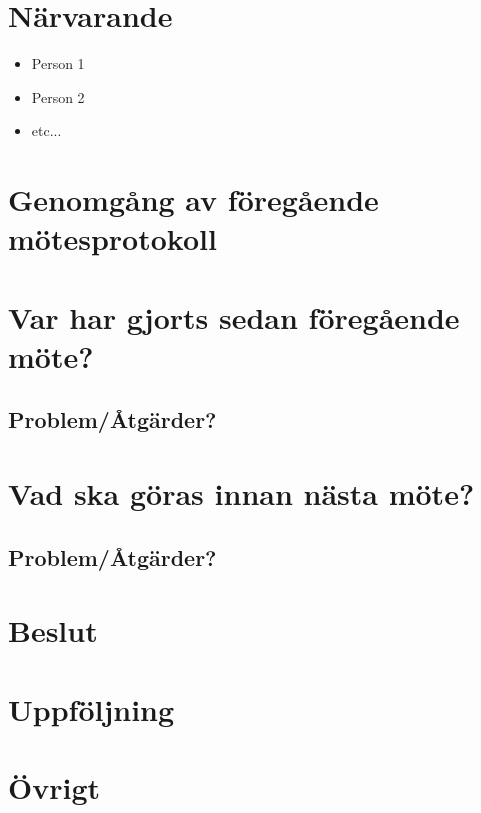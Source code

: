 
\section*{Närvarande}
\begin{itemize}[noitemsep]
    \item Person 1
    \item Person 2
    \item etc...
\end{itemize}

\section*{Genomgång av föregående mötesprotokoll}


\section*{Var har gjorts sedan föregående möte?}

\subsection*{Problem/Åtgärder?}


\section*{Vad ska göras innan nästa möte?}

\subsection*{Problem/Åtgärder?}


\section*{Beslut}

\section*{Uppföljning}

\section*{Övrigt}